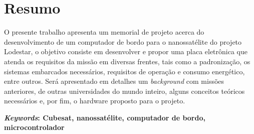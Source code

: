 \chapter*{Resumo}
O presente trabalho apresenta um memorial de projeto acerca do desenvolvimento de um computador de bordo para o nanossatélite do projeto Lodestar, o objetivo consiste em desenvolver e propor uma placa eletrônica que atenda os requisitos da missão em diversas frentes, tais como a padronização, os sistemas embarcados necessários, requisitos de operação e consumo energético, entre outros. Será apresentado em detalhes um \textit{background} com missões anteriores, de outras universidades do mundo inteiro, alguns conceitos teóricos necessários e, por fim, o hardware proposto para o projeto.

\textbf{\textit{Keywords}: Cubesat, nanossatélite, computador de bordo, microcontrolador}